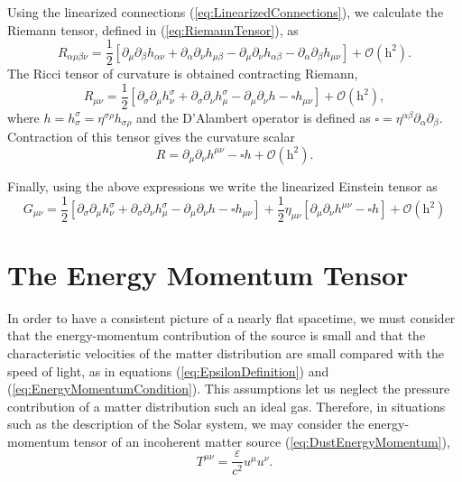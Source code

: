 Using the linearized connections (\ref{eq:LinearizedConnections}), we calculate the Riemann tensor, defined in (\ref{eq:RiemannTensor}), as
\begin{equation}
R_{\alpha \mu \beta \nu} = \frac{1}{2} \left[ \partial_\mu \partial_\beta h_{\alpha \nu} + \partial_\alpha \partial_\nu h_{\mu \beta}  - \partial_\mu \partial_\nu h_{\alpha \beta}  - \partial_\alpha \partial_\beta h_{\mu \nu}   \right] + \mathcal{O} ( \textrm{h}^2 ). \label{eq:LinearizedRiemann}
\end{equation}
The Ricci tensor of curvature is obtained contracting Riemann,
\begin{equation}
R_{\mu \nu} = \frac{1}{2} \left[ \partial _\sigma \partial _\mu h ^\sigma _\nu + \partial _\sigma \partial _\nu h ^\sigma _\mu - \partial _\mu \partial _\nu h - \square h_{\mu \nu} \right] + \mathcal{O} ( \textrm{h}^2 ) , \label{eq:LinearRicci}
\end{equation}
where $h = h^\sigma _\sigma = \eta^{\sigma \rho} h_{\sigma \rho}$ and the D'Alambert operator is defined as $\square = \eta ^{\alpha \beta}\partial _\alpha \partial _\beta $. Contraction of this tensor gives the curvature scalar
\begin{equation}
R =   \partial _\mu \partial _\nu h^{\mu \nu} - \square h + \mathcal{O} ( \textrm{h}^2 ) . \label{eq:LinearizedRicciScalar}
\end{equation}

Finally, using the above expressions we write the linearized Einstein tensor as
\begin{equation}
G_{\mu \nu} = \frac{1}{2} \left[ \partial _\sigma \partial _\mu h ^\sigma _\nu + \partial _\sigma \partial _\nu h ^\sigma _\mu - \partial _\mu \partial _\nu h - \square h_{\mu \nu} \right] + \frac{1}{2} \eta_{\mu \nu} \left[ \partial _\mu \partial _\nu h^{\mu \nu} - \square h  \right] + \mathcal{O} ( \textrm{h}^2 ) \label{eq:LinearizedEinstein}
\end{equation}

\section{The Energy Momentum Tensor} \label{sec:EnergyMomentumTensor}

In order to have a consistent picture of a nearly flat spacetime, we must consider that the energy-momentum contribution of the source is small and that the characteristic velocities of the matter distribution are small compared with the speed of light, as in equations (\ref{eq:EpsilonDefinition}) and (\ref{eq:EnergyMomentumCondition}). This assumptions let us neglect the pressure contribution of a matter distribution such an ideal gas. Therefore, in situations such as the description of the Solar system, we may consider the energy-momentum tensor of an incoherent matter source (\ref{eq:DustEnergyMomentum}),
\begin{equation}
T^{\mu \nu} = \frac{\varepsilon}{c^2} u^\mu u^\nu. \label{eq:DustEnergyMomentum}
\end{equation}

